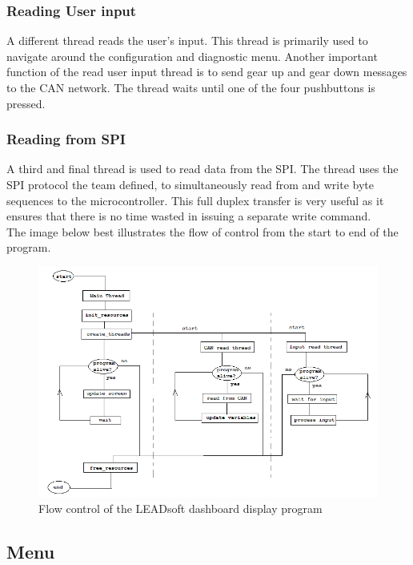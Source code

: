 \documentclass[11pt]{report} %
\begin{document}
	\subsubsection{Reading User input}
		A different thread reads the user's input. This thread is primarily used to navigate around the configuration and diagnostic 
		menu. Another important function of the read user input thread is to send gear up and gear down messages to the CAN network.
		The thread waits until one of the four pushbuttons is pressed.
		
	\subsubsection{Reading from SPI}		
		A third and final thread is used to read data from the SPI. The thread uses the SPI protocol the team defined, to 
		simultaneously read from and write byte sequences to the microcontroller. This full duplex transfer is very useful
		as it ensures that there is no time wasted in issuing a separate write command.\\
	
	The image below best illustrates the flow of control from the start to end of the program.
	
	\begin{figure}[H]
	\centering
	\includegraphics[scale=0.80]{images/program_arch.png}
	\caption{Flow control of the LEADsoft dashboard display program}\label{fig:program architecture}
	\end{figure}
	
	
	\subsection {Menu}
		
\end{document}
